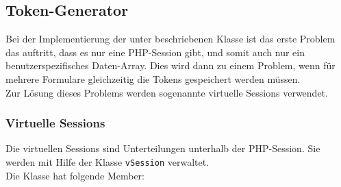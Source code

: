 \subsection{Token-Generator}
\label{sec:content_imple_hashgenerator}
Bei der Implementierung der unter  beschriebenen Klasse ist das erste Problem das auftritt, dass es nur eine PHP-Session gibt, und somit auch nur ein benutzerspezifisches Daten-Array. Dies wird dann zu einem Problem, wenn für mehrere Formulare gleichzeitig die Tokens gespeichert werden müssen.\\
Zur Lösung dieses Problems werden sogenannte virtuelle Sessions verwendet.

\subsubsection{Virtuelle Sessions}
Die virtuellen Sessions sind Unterteilungen unterhalb der PHP-Session. Sie werden mit Hilfe der Klasse \texttt{vSession} verwaltet.\\
Die Klasse hat folgende Member:
